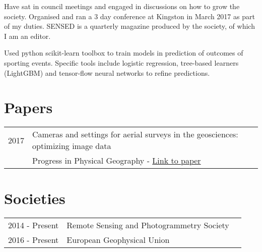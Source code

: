 \documentclass[]{JOC_CV}
\begin{document}
\begin{minipage}[t]{0.66\textwidth}
\linebreak
{}
Have sat in council meetings and engaged in discussions on how to grow the society.
Organised and ran a 3 day conference at Kingston in March 2017 as part of my duties.
SENSED is a quarterly magazine produced by the society, of which I am an editor.
\sectionsep

\linebreak
{}
Used python scikit-learn toolbox to train models in prediction of outcomes of sporting events.
Specific tools include logistic regression, tree-based learners (LightGBM) and tensor-flow neural
networks to refine predictions.
\sectionsep


\section{Papers}\label{sec:papers}

\begin{tabular}{rll}
2017	& Cameras and settings for aerial surveys in the geosciences: optimizing image data \\
&Progress in Physical Geography - \href{https://dx.doi.org/10.1177/0309133317703092}{Link to paper}
 \\
\end{tabular}
\sectionsep


\section{Societies}\label{sec:societies}

\begin{tabular}{rll}
2014 - Present	& Remote Sensing and Photogrammetry Society\\
2016 - Present	& European Geophysical Union\\
\end{tabular}
\sectionsep

\end{minipage}
\end{document}
